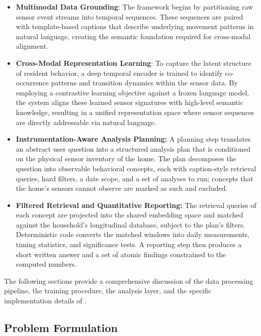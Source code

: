\begin{itemize}
    \item \textbf{Multimodal Data Grounding}:
    The framework begins by partitioning raw sensor event streams into temporal sequences. These sequences are paired with template-based captions that describe underlying movement patterns in natural language, creating the semantic foundation required for cross-modal alignment.

    \item \textbf{Cross-Modal Representation Learning}:
    To capture the latent structure of resident behavior, a deep temporal encoder is trained to identify co-occurrence patterns and transition dynamics within the sensor data. By employing a contrastive learning objective against a frozen language model, the system aligns these learned sensor signatures with high-level semantic knowledge, resulting in a unified representation space where sensor sequences are directly addressable via natural language.

    \item \textbf{Instrumentation-Aware Analysis Planning:} A planning step translates an abstract user question into a structured analysis plan that is conditioned on the physical sensor inventory of the home. The plan decomposes the question into observable behavioral concepts, each with caption-style retrieval queries, hard filters, a date scope, and a set of analyses to run; concepts that the home's sensors cannot observe are marked as such and excluded.

    \item \textbf{Filtered Retrieval and Quantitative Reporting:} The retrieval queries of each concept are projected into the shared embedding space and matched against the household's longitudinal database, subject to the plan's filters. Deterministic code converts the matched windows into daily measurements, timing statistics, and significance tests. A reporting step then produces a short written answer and a set of atomic findings constrained to the computed numbers.
\end{itemize}

The following sections provide a comprehensive discussion of the data processing pipeline, the training procedure, the analysis layer, and the specific implementation details of \ToolName.


\subsection{Problem Formulation}
\label{sec:problem_formulation}

